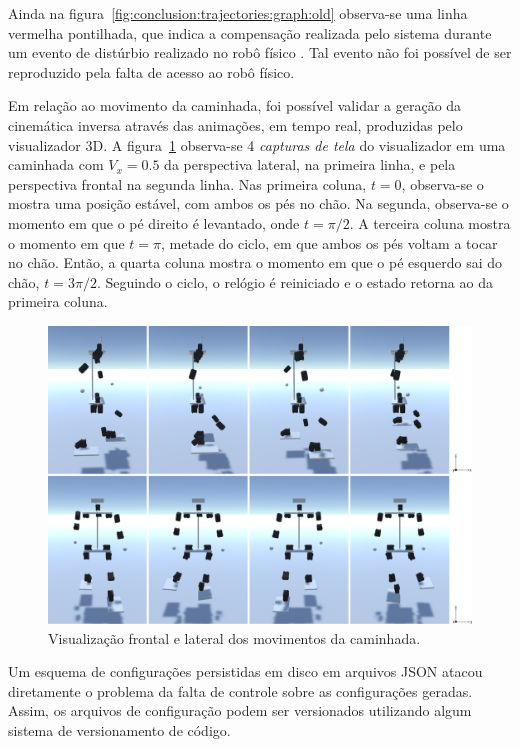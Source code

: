 Ainda na figura~\ref{fig:conclusion:trajectories:graph:old} observa-se uma linha vermelha pontilhada, que indica a compensação realizada pelo sistema durante um evento de distúrbio realizado no robô físico \cite{karimionline}. Tal evento não foi possível de ser reproduzido pela falta de acesso ao robô físico.

Em relação ao movimento da caminhada, foi possível validar a geração da cinemática inversa através das animações, em tempo real, produzidas pelo visualizador 3D. A figura~\ref{fig:conclusion:arash:frames} observa-se 4 \textit{capturas de tela} do visualizador em uma caminhada com $V_x = 0.5$ da perspectiva lateral, na primeira linha, e pela perspectiva frontal na segunda linha. Nas primeira coluna, $t = 0$, observa-se o mostra uma posição estável, com ambos os pés no chão. Na segunda, observa-se o momento em que o pé direito é levantado, onde $t = \pi/2$. A terceira coluna mostra o momento em que $t = \pi$, metade do ciclo, em que ambos os pés voltam a tocar no chão. Então, a quarta coluna mostra o momento em que o pé esquerdo sai do chão, $t = 3\pi/2$. Seguindo o ciclo, o relógio é reiniciado e o estado retorna ao da primeira coluna.

\begin{figure}[htb]
	\centering
	\includegraphics[width=\textwidth]{imagens/svg/conclusion-arash-frames}
	\caption{Visualização frontal e lateral dos movimentos da caminhada.}
	\label{fig:conclusion:arash:frames}
\end{figure}

Um esquema de configurações persistidas em disco em arquivos JSON atacou diretamente o problema da falta de controle sobre as configurações geradas. Assim, os arquivos de configuração podem ser versionados utilizando algum sistema de versionamento de código.

